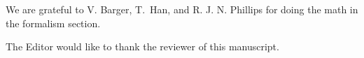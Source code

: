 \begin{article}
%
%

\acknowledgments
 We are grateful to V. Barger, \linebreak
T.~Han, and R. J. N. Phillips for doing 
the math in the formalism section.

The Editor would like to thank the reviewer of 
this manu\-script.






%
%




\end{article}
